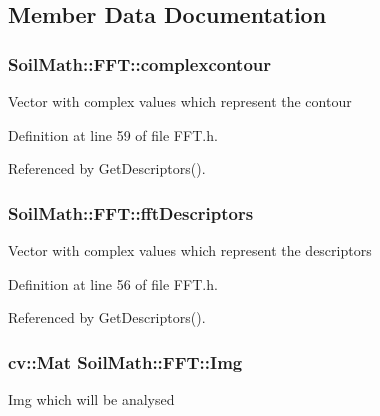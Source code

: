 \subsection{Member Data Documentation}
\hypertarget{class_soil_math_1_1_f_f_t_a48141f0c777ca86f2e536f88b509b639}{}
\subsubsection[{complexcontour}]{ Soil\+Math\+::\+F\+F\+T\+::complexcontour\hspace{0.3cm}{\ttfamily [private]}}\label{class_soil_math_1_1_f_f_t_a48141f0c777ca86f2e536f88b509b639}
Vector with complex values which represent the contour 

Definition at line 59 of file F\+F\+T.\+h.



Referenced by Get\+Descriptors().

\hypertarget{class_soil_math_1_1_f_f_t_a466b360529319d0e6e3220f446f703be}{}
\subsubsection[{fft\+Descriptors}]{ Soil\+Math\+::\+F\+F\+T\+::fft\+Descriptors\hspace{0.3cm}{\ttfamily [private]}}\label{class_soil_math_1_1_f_f_t_a466b360529319d0e6e3220f446f703be}
Vector with complex values which represent the descriptors 

Definition at line 56 of file F\+F\+T.\+h.



Referenced by Get\+Descriptors().

\hypertarget{class_soil_math_1_1_f_f_t_a2efda8f90cd255a2c18352636352044f}{}
\subsubsection[{Img}]{\setlength{\rightskip}{0pt plus 5cm}cv\+::\+Mat Soil\+Math\+::\+F\+F\+T\+::\+Img\hspace{0.3cm}{\ttfamily [private]}}\label{class_soil_math_1_1_f_f_t_a2efda8f90cd255a2c18352636352044f}
Img which will be analysed 

